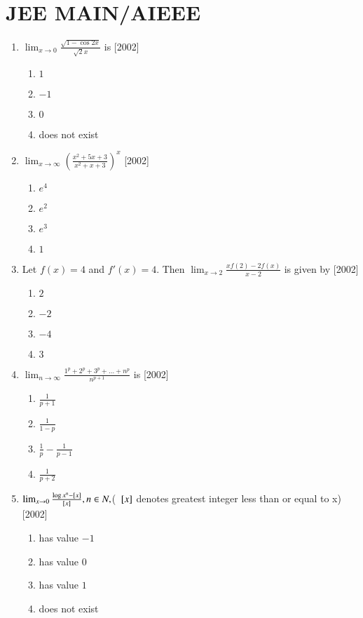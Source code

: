 \documentclass[journal,12pt,twocolumn]{IEEEtran}
\theoremstyle{remark}
\begin{document}
\section*{\textbf{JEE MAIN/AIEEE}}
\begin{enumerate}
    \item $\lim_{x\to 0}{\frac{\sqrt{1-\cos{2x}}}{\sqrt{2}x}}$ is
	    \hfill[2002]
    \begin{enumerate}[label=(\alph*)]
			\item $1$
			\item $-1$
			\item $0$
			\item does not exist
		\end{enumerate}
    \item  $\lim_{x\to \infty}({\frac{x^2+5x+3}{x^2+x+3}})^x$
	    \hfill[2002]
    \begin{enumerate}[label=(\alph*)]
			\item $e^4$
			\item $e^2$
			\item $e^3$
			\item $1$
		\end{enumerate}
    \item Let $f(x)=4$ and $f'(x)=4$. Then $\lim_{x\to 2}{\frac{xf(2)-2f(x)}{x-2}}$ is given by
	    \hfill[2002]
    \begin{enumerate}[label=(\alph*)]
			\item $2$
			\item $-2$
			\item $-4$
			\item $3$
		\end{enumerate}
    \item $\lim_{n\to \infty}{\frac{1^p+2^p+3^p+\dots+n^p}{n^{p+1}}}$ is
	    \hfill[2002]
    \begin{enumerate}[label=(\alph*)]
			\item $\frac{1}{p+1}$
			\item $\frac{1}{1-p}$
			\item $\frac{1}{p}-\frac{1}{p-1}$
			\item $\frac{1}{p+2}$
		\end{enumerate}
	\item $\lim_{x\to 0}{\frac{\log x^n- {}\left[x\right]}{{}\left[x\right]}}, n\in N, $( ${}\left[x\right]$ denotes greatest integer less than or equal to x)
	    \hfill[2002]
    \begin{enumerate}[label=(\alph*)]
			\item has value $-1$
			\item has value $0$
			\item has value $1$
			\item does not exist
		\end{enumerate}

\end{enumerate}
\end{document}
